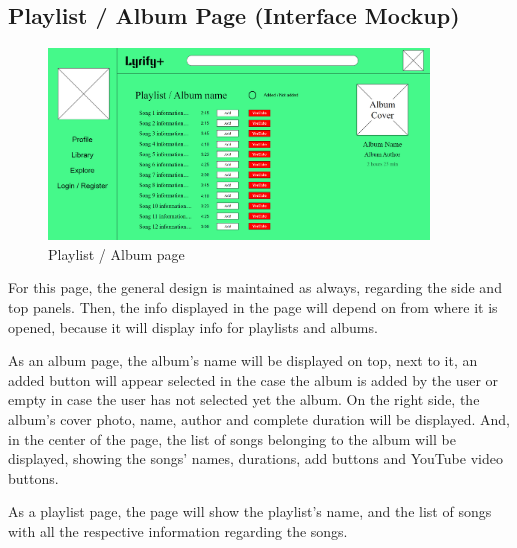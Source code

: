 \subsection{Playlist / Album Page (Interface Mockup)}

\begin{figure}[h!]
\centering
\includegraphics[width=0.9\textwidth]{sections/PLL/PlaylistPageMockup.png}
\caption{Playlist / Album page}
\end{figure}

For this page, the general design is maintained as always, regarding the side and top panels. Then, the info displayed in the page will depend on from where it is opened, because it will display info for playlists and albums.

As an album page, the album’s name will be displayed on top, next to it, an added button will appear selected in the case the album is added by the user or empty in case the user has not selected yet the album. On the right side, the album’s cover photo, name, author and complete duration will be displayed. And, in the center of the page, the list of songs belonging to the album will be displayed, showing the songs’ names, durations, add buttons and YouTube video buttons.

As a playlist page, the page will show the playlist’s name, and the list of songs with all the respective information regarding the songs.